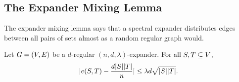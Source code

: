 \subsection{The Expander Mixing Lemma}
\label{subsec:mixing-lemma}

The expander mixing lemma says that a spectral expander distributes edges between all pairs of sets almost as a random regular graph would.

\begin{lemma}
	\label{lem:expander-mixing}
	Let \(G=(V,E)\) be a \(d\)-regular \((n,d,\lambda)\)-expander. For all \(S,T\subseteq V\),
	\begin{equation}
		\lvert e(S,T)-\frac{d\lvert S\rvert\lvert T\rvert}{n}\rvert\leq \lambda d\sqrt{\lvert S\rvert\lvert T\rvert}.
	\end{equation}
\end{lemma}

